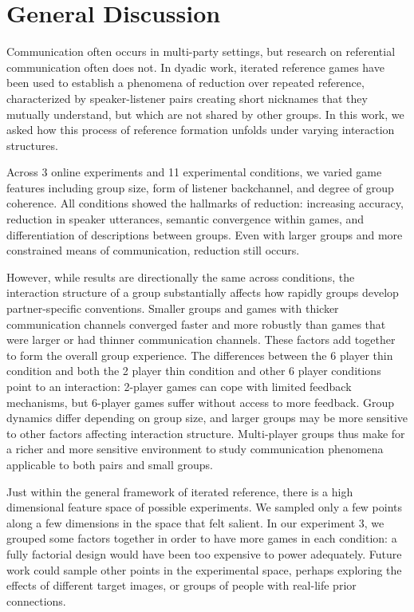 \documentclass[
  english,
  a4paper,
]{article}
\begin{document}
\hypertarget{general-discussion}{%
\section{General Discussion}\label{general-discussion}}

Communication often occurs in multi-party settings, but research on referential communication often does not. In dyadic work, iterated reference games have been used to establish a phenomena of reduction over repeated reference, characterized by speaker-listener pairs creating short nicknames that they mutually understand, but which are not shared by other groups. In this work, we asked how this process of reference formation unfolds under varying interaction structures.

Across 3 online experiments and 11 experimental conditions, we varied game features including group size, form of listener backchannel, and degree of group coherence. All conditions showed the hallmarks of reduction: increasing accuracy, reduction in speaker utterances, semantic convergence within games, and differentiation of descriptions between groups. Even with larger groups and more constrained means of communication, reduction still occurs.

However, while results are directionally the same across conditions, the interaction structure of a group substantially affects how rapidly groups develop partner-specific conventions. Smaller groups and games with thicker communication channels converged faster and more robustly than games that were larger or had thinner communication channels. These factors add together to form the overall group experience. The differences between the 6 player thin condition and both the 2 player thin condition and other 6 player conditions point to an interaction: 2-player games can cope with limited feedback mechanisms, but 6-player games suffer without access to more feedback. Group dynamics differ depending on group size, and larger groups may be more sensitive to other factors affecting interaction structure. Multi-player groups thus make for a richer and more sensitive environment to study communication phenomena applicable to both pairs and small groups.

Just within the general framework of iterated reference, there is a high dimensional feature space of possible experiments. We sampled only a few points along a few dimensions in the space that felt salient. In our experiment 3, we grouped some factors together in order to have more games in each condition: a fully factorial design would have been too expensive to power adequately. Future work could sample other points in the experimental space, perhaps exploring the effects of different target images, or groups of people with real-life prior connections.
\end{document}
